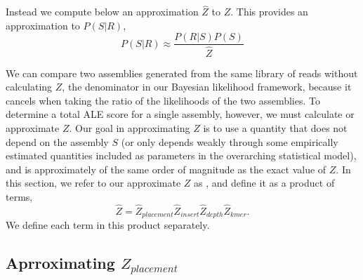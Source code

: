 \documentclass[phd,tocprelim]{cornell}
\begin{document}
Instead we compute below an approximation $\hat{Z}$ to $Z$.  This provides an approximation to $P(S|R)$,
\begin{equation}
    P(S|R) \approx \frac{P(R|S)P(S)}{\hat{Z}}
\end{equation}

We can compare two assemblies generated from the same library of reads without calculating $Z$, the denominator in our Bayesian likelihood framework, because it cancels when taking the ratio of the likelihoods of the two assemblies. To determine a total ALE score for a single assembly, however, we must calculate or approximate $Z$. Our goal in approximating $Z$ is to use a quantity that does not depend on the assembly $S$ (or only depends weakly through some empirically estimated quantities included as parameters in the overarching statistical model), and is approximately of the same order of magnitude as the exact value of $Z$.  In this section, we refer to our approximate $Z$ as  , and define it as a product of terms,
\begin{equation}
    \hat{Z} = \hat{Z}_{placement}\hat{Z}_{insert}\hat{Z}_{depth}\hat{Z}_{kmer}.
\end{equation}
We define each term in this product separately.

\subsection{Aprroximating $Z_{placement}$} %
\label{sub:Aprroximating Z_placement}
\end{document}
